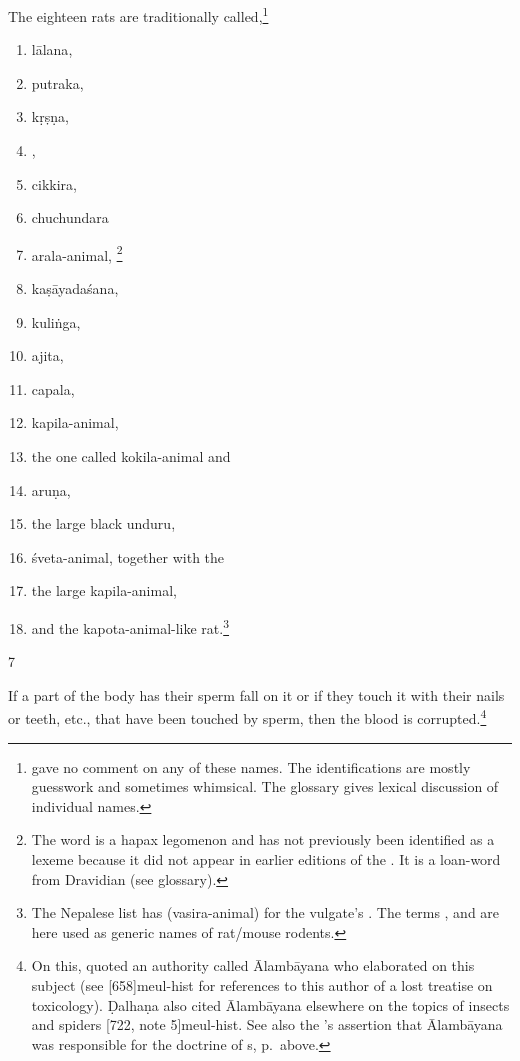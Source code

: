 \begin{translation}
    The eighteen rats are traditionally called,\footnote{ 
    gave no 
    comment on any of these names.  The identifications are 
    mostly guesswork and sometimes whimsical.  The glossary gives lexical 
    discussion of individual names.}
\begin{multicols}{2}
    \begin{enumerate}
        \item \Gls{lālana},
        \item \Gls{putraka},
        \item \Gls{kṛṣṇa},
        \item {},
        \item \Gls{cikkira}, %
        \item \Gls{chuchundara} %
        \item \Gls{arala-animal},%
\footnote{The word  is a hapax legomenon and has not 
previously been identified as a lexeme because it did not appear in earlier 
editions of the \SS.  It is a loan-word from Dravidian (see glossary).}        
        \item \Gls{kaṣāyadaśana},
        \item \Gls{kuliṅga},
        \item \Gls{ajita},
        \item \Gls{capala},
        \item \Gls{kapila-animal},
        \item the one called \Gls{kokila-animal} and 
        \item \Gls{aruṇa},
        \item the large black \gls{unduru}, 
        \item \Gls{śveta-animal}, together with the
        \item the large \Gls{kapila-animal},
        \item and the \Gls{kapota-animal}-like rat.\footnote{The Nepalese list has 
         (\Gls{vasira-animal}) for the 
        vulgate's .  The terms ,  and 
         are here used as generic names of rat/mouse rodents.}
\end{enumerate}
    \end{multicols}
\medskip
    
\item[7]

If a part of the body has their sperm fall on it or if they touch it
with their nails or teeth, etc., that have been touched by sperm,
then the blood is corrupted.\footnote{\label{alambayana2}On this,
     quoted an authority called Ālambāyana who
    elaborated on this subject (see [658]{meul-hist} for
    references to this author of a lost treatise on toxicology). Ḍalhaṇa
    also cited Ālambāyana elsewhere on the topics of insects and spiders
    [722, note 5]{meul-hist}. See also the \AS's assertion 
    that Ālambāyana was responsible for the doctrine of s, p.\,\pageref{alambayana1} above.
    
}
\end{translation}
